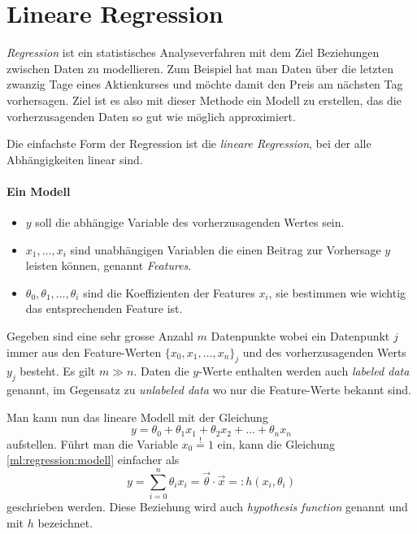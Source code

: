 %
%
%
%

\section{Lineare Regression\label{chapter:ml:regression}}

\emph{Regression} ist ein statistisches Analyseverfahren mit dem Ziel Beziehungen zwischen
Daten zu modellieren. Zum Beispiel hat man Daten über die letzten zwanzig Tage eines
Aktienkurses und möchte damit den Preis am nächsten Tag vorhersagen. Ziel ist es also mit
dieser Methode ein Modell zu erstellen, das die vorherzusagenden Daten so gut wie möglich
approximiert.

Die einfachste Form der Regression ist die \emph{lineare Regression}, bei der alle Abhängigkeiten linear
sind.

\paragraph{Ein Modell}
\begin{itemize}
    \item $y$ soll die abhängige Variable des vorherzusagenden Wertes sein.
    \item $x_1, \dots, x_i$ sind unabhängigen Variablen die einen Beitrag zur Vorhersage
    $y$ leisten können, genannt \emph{Features}.
    \item $\theta_0, \theta_1, \dots, \theta_i$ sind die Koeffizienten der Features $x_i$,
    sie bestimmen wie wichtig das entsprechenden Feature ist.
\end{itemize}

Gegeben sind eine sehr grosse Anzahl $m$ Datenpunkte wobei ein Datenpunkt $j$ immer aus
den Feature-Werten $\{ x_0, x_1, \dots, x_n \}_j$ und des vorherzusagenden Werts $y_j$ besteht.
Es gilt $m \gg n$. Daten die $y$-Werte enthalten werden auch \emph{labeled data} genannt,
im Gegensatz zu \emph{unlabeled data} wo nur die Feature-Werte bekannt sind.

Man kann nun das lineare Modell mit der Gleichung
\begin{equation}
y = \theta_0 + \theta_1 x_1 + \theta_2 x_2 + \dots + \theta_n x_n
\label{ml:regression:modell}
\end{equation}
aufstellen. Führt man die Variable $x_0 \overset{!}{=} 1$ ein, kann die Gleichung
\ref{ml:regression:modell} einfacher als
\begin{equation}
y = \sum_{i = 0}^{n} \theta_i x_i = \vec \theta \cdot \vec x =: h(x_i, \theta_i)
\label{ml:regression:hypothesis}
\end{equation}
geschrieben werden. Diese Beziehung wird auch \emph{hypothesis function} genannt und mit
$h$ bezeichnet.

